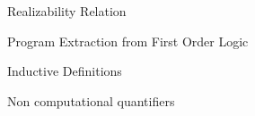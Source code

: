 Realizability Relation

Program Extraction from First Order Logic

Inductive Definitions


Non computational quantifiers